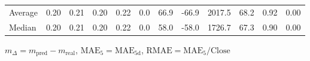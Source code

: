 \begin{threeparttable}
{\begin{tabular}{lrrrrrrrrrrr}
Average &          0.20 &          0.21 &          0.20 &        0.22 &                 0.0 &                66.9 &      -66.9 &              2017.5 &             68.2 &            0.92 &                   0.00 \\
 Median &          0.20 &          0.21 &          0.20 &        0.22 &                 0.0 &                58.0 &      -58.0 &              1726.7 &             67.3 &            0.90 &                   0.00 \\
\bottomrule
\end{tabular}
}
\begin{tablenotes}\footnotesize
\item $m_\Delta=m_{\text{pred}}-m_{\text{real}}$,
$\mathrm{MAE}_5=\mathrm{MAE}_{5\text{d}}$,
$\mathrm{RMAE}=\mathrm{MAE}_5/\text{Close}$
\end{tablenotes}
\end{threeparttable}
\endgroup

